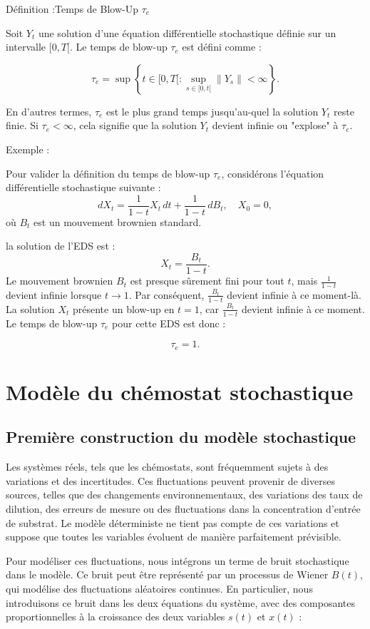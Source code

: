 \documentclass[12pt,a4paper]{report}%
\newcounter{definition}[section] %
\newenvironment{définition}[2][]
  {\refstepcounter{definition}%
  \begin{bclogo}[
    logo=\bcplume,
    couleur=blue!6,    %
    arrondi=0.1,
    couleurBord=white,#1]{Définition \thedefinition :#2}
  }
  {\end{bclogo}}
\newcounter{PP}[chapter]
\newenvironment{exemple}[2][]
  {\refstepcounter{PP}
  \begin{bclogo}[
    logo=\bccrayon , %
    couleur=white,
    arrondi=0.1,
    barre =snake,
     tailleOndu = 1.5,
    couleurBord=white,#1]{Exemple \thePP:#2}
  }
  {\end{bclogo}}
\begin{document}
\begin{définition}{Temps de Blow-Up \(\tau_e\) }
Soit \(Y_t\) une solution d'une équation différentielle stochastique définie sur un intervalle \([0, T[\). Le temps de blow-up \(\tau_e\) est défini comme :

\[
\tau_e = \sup \left\{ t \in [0, T[ : \sup_{s \in [0, t[} \|Y_s\| < \infty \right\}.
\]

En d'autres termes, \(\tau_e\) est le plus grand temps jusqu'au-quel la solution \(Y_t\) reste finie. Si \(\tau_e < \infty\), cela signifie que la solution \(Y_t\) devient infinie ou "explose" à \(\tau_e\).
\end{définition}
\begin{exemple}{}
Pour valider la définition du temps de blow-up \(\tau_e\), considérons l'équation différentielle stochastique suivante :
\[
dX_t = \frac{1}{1 - t} X_t \, dt + \frac{1}{1 - t} \, dB_t, \quad X_0 = 0,
\]
où \(B_t\) est un mouvement brownien standard.

la solution de l'EDS est :
\[
X_t = \frac{B_t}{1 - t}.
\]
Le mouvement brownien \(B_t\) est presque sûrement fini pour tout \(t\), mais \(\frac{1}{1 - t}\) devient infinie lorsque \(t \to 1\). Par conséquent, \(\frac{B_t}{1 - t}\) devient infinie à ce moment-là.\\
La solution \(X_t\) présente un blow-up en \(t = 1\), car \(\frac{B_t}{1 - t}\) devient infinie à ce moment. Le temps de blow-up \(\tau_e\) pour cette EDS est donc :

\[
\tau_e = 1.
\]
\end{exemple}
\chapter{Modèle du chémostat stochastique }


\section{Première construction du modèle stochastique}
Les systèmes réels, tels que les chémostats, sont fréquemment sujets à des variations et des incertitudes. Ces fluctuations peuvent provenir de diverses sources, telles que des changements environnementaux, des variations des taux de dilution, des erreurs de mesure ou des fluctuations dans la concentration d'entrée de substrat. Le modèle déterministe ne tient pas compte de ces variations et suppose que toutes les variables évoluent de manière parfaitement prévisible.

Pour modéliser ces fluctuations, nous intégrons un terme de bruit stochastique dans le modèle. Ce bruit peut être représenté par un processus de Wiener \(B(t)\), qui modélise des fluctuations aléatoires continues. En particulier, nous introduisons ce bruit dans les deux équations du système, avec des composantes proportionnelles à la croissance des deux variables \(s(t)\) et \(x(t)\) :
\end{document}
